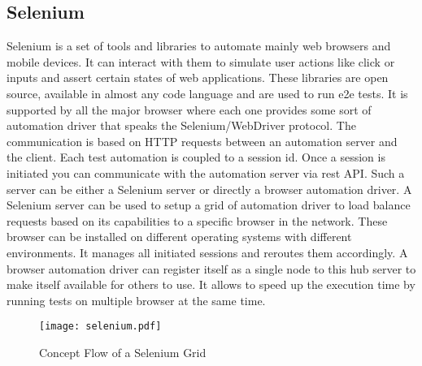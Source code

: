 \subsection{Selenium\label{sec:history}}

Selenium is a set of tools and libraries to automate mainly web browsers and mobile devices.
It can interact with them to simulate user actions like click or inputs and assert certain
states of web applications. These libraries are open source, available in almost any code
language and are used to run e2e tests. It is supported by all the major browser where each
one provides some sort of automation driver that speaks the Selenium/WebDriver protocol. The
communication is based on HTTP requests between an automation server and the client. Each
test automation is coupled to a session id. Once a session is initiated you can communicate
with the automation server via rest API. Such a server can be either a Selenium server or directly
a browser automation driver. A Selenium server can be used to setup a grid of automation driver
to load balance requests based on its capabilities to a specific browser in the network. These
browser can be installed on different operating systems with different environments. It manages
all initiated sessions and reroutes them accordingly. A browser automation driver can register
itself as a single node to this hub server to make itself available for others to use. It allows
to speed up the execution time by running tests on multiple browser at the same time.

\begin{figure}[htb]
  \centering
  \texttt{[image: selenium.pdf]}\\
  \caption{Concept Flow of a Selenium Grid}\label{fig:selenium}
\end{figure}

